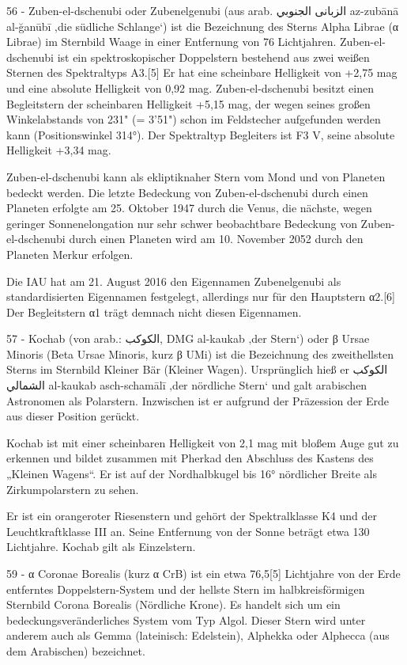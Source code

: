 56 - Zuben-el-dschenubi oder Zubenelgenubi (aus arab. الزبانى الجنوبي az-zubānā al-ğanūbī ‚die südliche Schlange‘) ist die Bezeichnung des Sterns Alpha Librae (α Librae) im Sternbild Waage in einer Entfernung von 76 Lichtjahren. Zuben-el-dschenubi ist ein spektroskopischer Doppelstern bestehend aus zwei weißen Sternen des Spektraltyps A3.[5] Er hat eine scheinbare Helligkeit von +2,75 mag und eine absolute Helligkeit von 0,92 mag. Zuben-el-dschenubi besitzt einen Begleitstern der scheinbaren Helligkeit +5,15 mag, der wegen seines großen Winkelabstands von 231" (= 3'51") schon im Feldstecher aufgefunden werden kann (Positionswinkel 314°). Der Spektraltyp Begleiters ist F3 V, seine absolute Helligkeit +3,34 mag.

Zuben-el-dschenubi kann als ekliptiknaher Stern vom Mond und von Planeten bedeckt werden. Die letzte Bedeckung von Zuben-el-dschenubi durch einen Planeten erfolgte am 25. Oktober 1947 durch die Venus, die nächste, wegen geringer Sonnenelongation nur sehr schwer beobachtbare Bedeckung von Zuben-el-dschenubi durch einen Planeten wird am 10. November 2052 durch den Planeten Merkur erfolgen.

Die IAU hat am 21. August 2016 den Eigennamen Zubenelgenubi als standardisierten Eigennamen festgelegt, allerdings nur für den Hauptstern α2.[6] Der Begleitstern α1 trägt demnach nicht diesen Eigennamen. 



57 - Kochab (von arab.: الكوكب, DMG al-kaukab ‚der Stern‘) oder β Ursae Minoris (Beta Ursae Minoris, kurz β UMi) ist die Bezeichnung des zweithellsten Sterns im Sternbild Kleiner Bär (Kleiner Wagen). Ursprünglich hieß er الكوكب الشمالي al-kaukab asch-schamālī ‚der nördliche Stern‘ und galt arabischen Astronomen als Polarstern. Inzwischen ist er aufgrund der Präzession der Erde aus dieser Position gerückt.

Kochab ist mit einer scheinbaren Helligkeit von 2,1 mag mit bloßem Auge gut zu erkennen und bildet zusammen mit Pherkad den Abschluss des Kastens des „Kleinen Wagens“. Er ist auf der Nordhalbkugel bis 16° nördlicher Breite als Zirkumpolarstern zu sehen.

Er ist ein orangeroter Riesenstern und gehört der Spektralklasse K4 und der Leuchtkraftklasse III an. Seine Entfernung von der Sonne beträgt etwa 130 Lichtjahre. Kochab gilt als Einzelstern. 



59 - α Coronae Borealis (kurz α CrB) ist ein etwa 76,5[5] Lichtjahre von der Erde entferntes Doppelstern-System und der hellste Stern im halbkreisförmigen Sternbild Corona Borealis (Nördliche Krone). Es handelt sich um ein bedeckungsveränderliches System vom Typ Algol. Dieser Stern wird unter anderem auch als Gemma (lateinisch: Edelstein), Alphekka oder Alphecca (aus dem Arabischen) bezeichnet.

